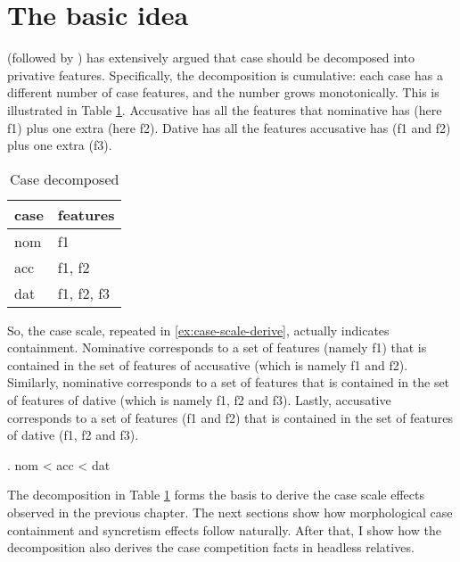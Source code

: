 \section{The basic idea}

\citet{caha2009,caha2013} (followed by \citealt[cf.][]{starke2009,bobaljik2012,mcfadden2018,smith2019,vanbaal2018}) has extensively argued that case should be decomposed into privative features. Specifically, the decomposition is cumulative: each case has a different number of case features, and the number grows monotonically.
This is illustrated in Table \ref{tbl:case-decomposed}. Accusative has all the features that nominative has (here \ac{f}1) plus one extra (here \ac{f}2). Dative has all the features accusative has (\ac{f}1 and \ac{f}2) plus one extra (\ac{f}3).

\begin{table}[ht]
  \center
	\caption {Case decomposed}
		\begin{tabular}{ll}
    \toprule
    case      & features                  \\
    \midrule
    \ac{nom} & \ac{f}1                    \\
    \ac{acc} & \ac{f}1, \ac{f}2           \\
    \ac{dat} & \ac{f}1, \ac{f}2, \ac{f}3  \\
    \bottomrule
    \end{tabular}
    \label{tbl:case-decomposed}
\end{table}

So, the case scale, repeated in \ref{ex:case-scale-derive}, actually indicates containment.
Nominative corresponds to a set of features (namely \ac{f}1) that is contained in the set of features of accusative (which is namely \ac{f}1 and \ac{f}2).
Similarly, nominative corresponds to a set of features that is contained in the set of features of dative (which is namely \ac{f}1, \ac{f}2 and \ac{f}3).
Lastly, accusative corresponds to a set of features (\ac{f}1 and \ac{f}2) that is contained in the set of features of dative (\ac{f}1, \ac{f}2 and \ac{f}3).

\ex. \ac{nom} < \ac{acc} < \ac{dat}\label{ex:case-scale-derive}

The decomposition in Table \ref{tbl:case-decomposed} forms the basis to derive the case scale effects observed in the previous chapter. The next sections show how morphological case containment and syncretism effects follow naturally. After that, I show how the decomposition also derives the case competition facts in headless relatives.


